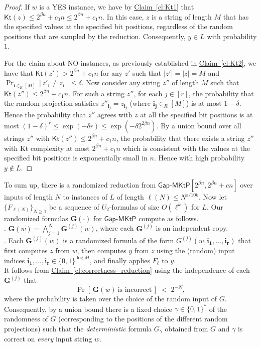 \documentclass[11pt]{article}
\numberwithin{equation}{section}
\theoremstyle{definition}
\theoremstyle{plain}
\newcommand{\expref}[2]{\hyperref[#2]{#1~\ref{#2}}}
\newcommand{\gapmktp}{\mathsf{Gap}$-$\mathsf{MKtP}}
\newcommand{\Kt}{\mathsf{Kt}}
\begin{document}
\begin{proof}
If $w$ is a YES instance, we have by \expref{Claim}{cl:Kt1} that $\Kt(z) \leq 2^{\beta n} + c_0n \leq 2^{\beta n} + c_1 n$. In this case, $z$ is a string of length $M$ that has the specified values at the specified bit positions, regardless of the random positions that are sampled by the reduction. Consequently, $y \in L$ with probability $1$.

For the claim about NO instances, as previously established in \expref{Claim}{cl:Kt2}, we have that $\Kt(z') > 2^{\beta n} + c_1 n$ for any $z'$ such that $|z'| = |z| = M$ and $\Pr_{{\bm i} \in_R [M]}[z'_{\bm i} \neq z_{\bm i}] \leq \delta$. Now consider any string $z''$ of length $M$ such that $\Kt(z'') \leq 2^{\beta n} + c_1 n$. For such a string $z''$, for each $j \in [r]$, the probability that the random projection satisfies $z''_{\bm{i_j}} = z_{ \bm{i_j}}$ (where ${\bm{i_j}} \in_R [M]$) is at most $1-\delta$. Hence the probability that $z''$ agrees with $z$ at all the specified bit positions is at most $(1-\delta)^r \leq \exp(-\delta r) \leq \exp(-\delta 2^{2\beta n})$. By a union bound over all strings $z''$ with $\Kt(z'') \leq 2^{\beta n} + c_1n$, the probability that there exists a string $z''$ with Kt complexity at most $2^{\beta n} + c_1n$ which is consistent with the values at the specified bit positions is exponentially small in $n$. Hence with high probability $y \notin L$.
\end{proof}

To sum up, there is a randomized reduction from $\gapmktp[2^{\beta n},2^{\beta n} + cn ]$ over inputs of length $N$ to instances of $L$ of length $\ell(N) \leq N^{\varepsilon/10k}$. Now let $\{F_{\ell(N)}\}_{N \geq 1}$ be a sequence of $U_2$-formulas of size $O(\ell^k)$ for $L$. Our randomized formulas $\bm{G}(\cdot)$ for $\gapmktp$ compute as follows.\\

. $\bm{G}(w) = \bigwedge_{j = 1}^N \bm{G}^{(j)}(w)$, where each $\bm{G}^{(j)}$ is an independent copy.\\

. Each $\bm{G}^{(j)}(w)$ is a randomized formula of the form $G^{(j)}(w, \bm{i_1}, \ldots, \bm{i_r})$ that first computes $z$ from $w$, then computes $y$ from $z$ using the (random) input indices $\bm{i_1}, \ldots, \bm{i_r} \in \{0,1\}^{\log M}$, and finally applies $F_\ell$ to $y$.\\

It follows from \expref{Claim}{cl:correctness_reduction} using the independence of each $\bm{G}^{(j)}$ that $$\Pr[\,\bm{G}(w)~\text{is incorrect}\,] \;<\; 2^{-N},$$ where the probability is taken over the choice of the random input of $G$. Consequently, by a union bound there is a fixed choice $\gamma \in \{0,1\}^*$ of the randomness of $G$ (corresponding to the positions of the different random projections) such that the \emph{deterministic} formula $G_\gamma$ obtained from $G$ and $\gamma$ is correct on \emph{every} input string $w$.
\end{document}
